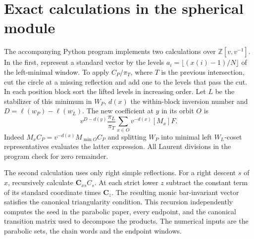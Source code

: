 \newpage
\section{Exact calculations in the spherical module}
\label{sec:checks}

The accompanying Python program implements two calculations over
$\mathbb Z[v,v^{-1}]$. In the first, represent a standard vector by the
levels $a_i=\lfloor(x(i)-1)/N\rfloor$ of the left-minimal window.
To apply $C_P/\pi_T$, where $T$ is the previous intersection, cut the
circle at a missing reflection and add one to the levels that pass the cut.
In each position block sort the lifted levels in increasing order. Let $L$
be the stabilizer of this minimum in $W_P$, $d(x)$ the within-block
inversion number and $D=\ell(w_P)-\ell(w_L)$. The new coefficient at $y$
in its orbit $O$ is
\[
 v^{D-d(y)}\frac{\pi_L}{\pi_T}\sum_{x\in O}v^{-d(x)}[M_x]F .
\]
Indeed $M_xC_P=v^{-d(x)}M_{\min O}C_P$ and splitting $W_P$ into
minimal left $W_L$-coset representatives evaluates the latter expression.
All Laurent divisions in the program check for zero remainder.

The second calculation uses only right simple reflections. For a right
descent $s$ of $x$, recursively calculate $\mathbf C_{xs}C_s$. At
each strict lower $z$ subtract the constant term of its standard
coordinate times $\mathbf C_z$. The resulting monic bar-invariant
vector satisfies the canonical triangularity condition. This recursion independently computes the seed in the parabolic paper, every endpoint, and the canonical transition matrix
used to decompose the products. The numerical inputs are the parabolic
sets, the chain words and the endpoint windows.

